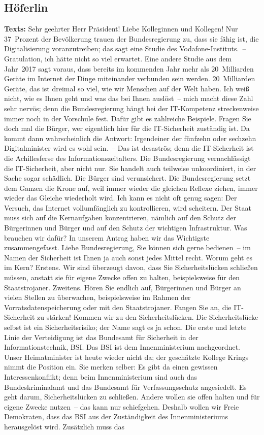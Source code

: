 \documentclass{article}
\begin{document}
\subsection{Höferlin}
\noindent\textbf{Texts:} Sehr geehrter Herr Präsident! Liebe Kolleginnen und Kollegen! Nur 37 Prozent der Bevölkerung trauen der Bundesregierung zu, dass sie fähig ist, die Digitalisierung voranzutreiben; das sagt eine Studie des Vodafone-Instituts. – Gratulation, ich hätte nicht so viel erwartet. Eine andere Studie aus dem Jahr 2017 sagt voraus, dass bereits im kommenden Jahr mehr als 20 Milliarden Geräte im Internet der Dinge miteinander verbunden sein werden. 20 Milliarden Geräte, das ist dreimal so viel, wie wir Menschen auf der Welt haben. Ich weiß nicht, wie es Ihnen geht und was das bei Ihnen auslöst – mich macht diese Zahl sehr nervös; denn die Bundesregierung hängt bei der IT-Kompetenz streckenweise immer noch in der Vorschule fest. Dafür gibt es zahlreiche Beispiele. Fragen Sie doch mal die Bürger, wer eigentlich hier für die IT-Sicherheit zuständig ist.  Da kommt dann wahrscheinlich die Antwort: Irgendeiner der fünfzehn oder sechzehn Digitalminister wird es wohl sein. – Das ist desaströs; denn die IT-Sicherheit ist die Achillesferse des Informationszeitalters.  Die Bundesregierung vernachlässigt die IT-Sicherheit, aber nicht nur. Sie handelt auch teilweise unkoordiniert, in der Sache sogar schädlich. Die Bürger sind verunsichert. Die Bundesregierung setzt dem Ganzen die Krone auf, weil immer wieder die gleichen Reflexe ziehen, immer wieder das Gleiche wiederholt wird. Ich kann es nicht oft genug sagen: Der Versuch, das Internet vollumfänglich zu kontrollieren, wird scheitern. Der Staat muss sich auf die Kernaufgaben konzentrieren, nämlich auf den Schutz der Bürgerinnen und Bürger und auf den Schutz der wichtigen Infrastruktur.  Was brauchen wir dafür? In unserem Antrag haben wir das Wichtigste zusammengefasst. Liebe Bundesregierung, Sie können sich gerne bedienen – im Namen der Sicherheit ist Ihnen ja auch sonst jedes Mittel recht.  Worum geht es im Kern? Erstens. Wir sind überzeugt davon, dass Sie Sicherheitslücken schließen müssen, anstatt sie für eigene Zwecke offen zu halten, beispielsweise für den Staatstrojaner. Zweitens. Hören Sie endlich auf, Bürgerinnen und Bürger an vielen Stellen zu überwachen, beispielsweise im Rahmen der Vorratsdatenspeicherung oder mit den Staatstrojaner.  Fangen Sie an, die IT-Sicherheit zu stärken! Kommen wir zu den Sicherheitslücken. Die Sicherheitslücke selbst ist ein Sicherheitsrisiko; der Name sagt es ja schon. Die erste und letzte Linie der Verteidigung ist das Bundesamt für Sicherheit in der Informationstechnik, BSI. Das BSI ist dem Innenministerium nachgeordnet. Unser Heimatminister ist heute wieder nicht da; der geschätzte Kollege Krings nimmt die Position ein. Sie merken selber: Es gibt da einen gewissen Interessenkonflikt; denn beim Innenministerium sind auch das Bundeskriminalamt und das Bundesamt für Verfassungsschutz angesiedelt. Es geht darum, Sicherheitslücken zu schließen. Andere wollen sie offen halten und für eigene Zwecke nutzen – das kann nur schiefgehen.  Deshalb wollen wir Freie Demokraten, dass das BSI aus der Zuständigkeit des Innenministeriums herausgelöst wird. Zusätzlich muss das 
\end{document}
